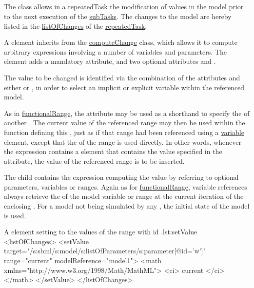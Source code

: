 \subsection{}
\label{class:setValue}
The  class allows in a \hyperref[class:repeatedTask]{repeatedTask} the modification of values in the model prior to the next execution of the \hyperref[class:subTask]{subTasks}. The changes to the model are hereby listed in the \hyperref[sec:listOfChanges]{listOfChanges} of the \hyperref[class:repeatedTask]{repeatedTask}.

A  element inherits from the \hyperref[class:computeChange]{computeChange} class, which allows it to compute arbitrary expressions involving a number of variables and parameters. The element  adds a mandatory  attribute, and two optional attributes  and .

The value to be changed is identified via the combination of the attributes  and either  or , in order to select an implicit or explicit variable within the referenced model.

As in \hyperref[class:functionalRange]{functionalRange}, the attribute  may be used as a shorthand to specify the  of another . The current value of the referenced range may then be used within the function defining this , just as if that range had been referenced using a \hyperref[class:variable]{variable} element, except that the  of the range is used directly. In other words, whenever the expression contains a  element that contains the value specified in the  attribute, the value of the referenced range is to be inserted.

The child  contains the expression computing the value by referring to optional parameters, variables or ranges.
Again as for \hyperref[class:functionalRange]{functionalRange}, variable references always retrieve the  of the model variable or range at the current iteration of the enclosing . For a model not being simulated by any , the initial state of the model is used.

\begin{myXmlLst}{A  element setting  to the values of the range with id .}{lst:setValue}
<listOfChanges>
	<setValue target="/s:sbml/s:model/s:listOfParameters/s:parameter[@id='w']"
		range="current" modelReference="model1">
		<math xmlns="http://www.w3.org/1998/Math/MathML">
			<ci> current </ci>
		</math>
	</setValue>
</listOfChanges>
\end{myXmlLst}
